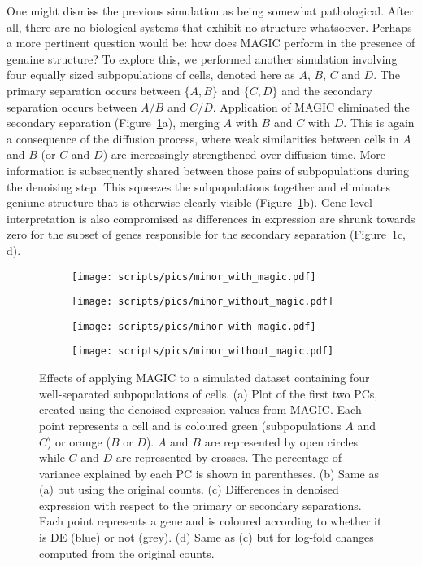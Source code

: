 \documentclass[10pt,letterpaper]{article}
\begin{document}
One might dismiss the previous simulation as being somewhat pathological.
After all, there are no biological systems that exhibit no structure whatsoever.
Perhaps a more pertinent question would be: how does MAGIC perform in the presence of genuine structure? 
To explore this, we performed another simulation involving four equally sized subpopulations of cells, denoted here as $A$, $B$, $C$ and $D$.
The primary separation occurs between $\{A, B\}$ and $\{C, D\}$ and the secondary separation occurs between $A/B$ and $C/D$.
Application of MAGIC eliminated the secondary separation (Figure~\ref{fig:fourclusters}a), merging $A$ with $B$ and $C$ with $D$.
This is again a consequence of the diffusion process, where weak similarities between cells in $A$ and $B$ (or $C$ and $D$) are increasingly strengthened over diffusion time.
More information is subsequently shared between those pairs of subpopulations during the denoising step.
This squeezes the subpopulations together and eliminates geniune structure that is otherwise clearly visible (Figure~\ref{fig:fourclusters}b).
Gene-level interpretation is also compromised as differences in expression are shrunk towards zero for the subset of genes responsible for the secondary separation (Figure~\ref{fig:fourclusters}c, d).

\begin{figure}[btp]
\centering
\begin{subfigure}[b]{0.49\textwidth}
    \texttt{[image: scripts/pics/minor\_with\_magic.pdf]}
    \caption{}
\end{subfigure}
\begin{subfigure}[b]{0.49\textwidth}
    \texttt{[image: scripts/pics/minor\_without\_magic.pdf]}
    \caption{}
\end{subfigure}
\begin{subfigure}[b]{0.49\textwidth}
    \texttt{[image: scripts/pics/minor\_with\_magic.pdf]}
    \caption{}
\end{subfigure}
\begin{subfigure}[b]{0.49\textwidth}
    \texttt{[image: scripts/pics/minor\_without\_magic.pdf]}
    \caption{}
\end{subfigure}
\caption{Effects of applying MAGIC to a simulated dataset containing four well-separated subpopulations of cells.
(a) Plot of the first two PCs, created using the denoised expression values from MAGIC.
Each point represents a cell and is coloured green (subpopulations $A$ and $C$) or orange ($B$ or $D$).
$A$ and $B$ are represented by open circles while $C$ and $D$ are represented by crosses.
The percentage of variance explained by each PC is shown in parentheses.
(b) Same as (a) but using the original counts.
(c) Differences in denoised expression with respect to the primary or secondary separations.
Each point represents a gene and is coloured according to whether it is DE (blue) or not (grey).
(d) Same as (c) but for log-fold changes computed from the original counts.}
\label{fig:fourclusters}
\end{figure}
\end{document}
